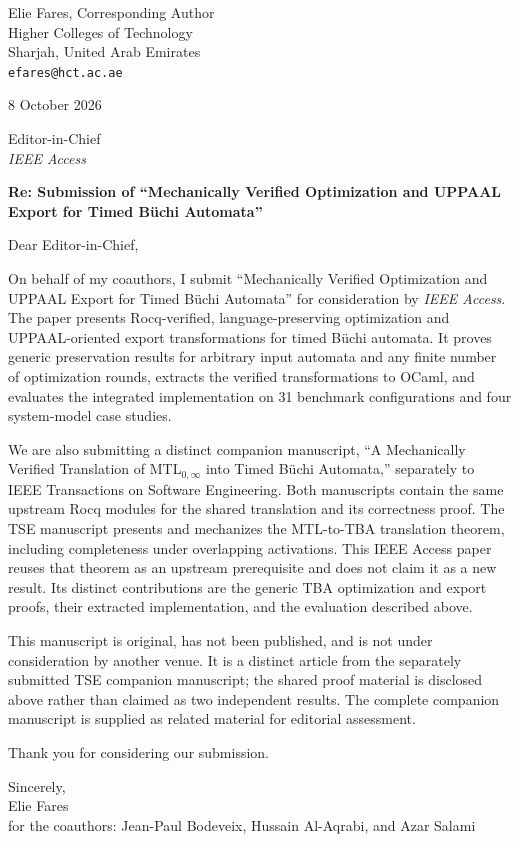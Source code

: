 \documentclass[11pt]{article}
\begin{document}
\begin{flushright}
Elie Fares, Corresponding Author\\
Higher Colleges of Technology\\
Sharjah, United Arab Emirates\\
\texttt{efares@hct.ac.ae}
\end{flushright}

8 October 2026

Editor-in-Chief\\
\emph{IEEE Access}

\textbf{Re: Submission of ``Mechanically Verified Optimization and UPPAAL Export for Timed B\"uchi Automata''}

Dear Editor-in-Chief,

On behalf of my coauthors, I submit ``Mechanically Verified Optimization and UPPAAL Export for Timed B\"uchi Automata'' for consideration by \emph{IEEE Access}. The paper presents Rocq-verified, language-preserving optimization and UPPAAL-oriented export transformations for timed B\"uchi automata. It proves generic preservation results for arbitrary input automata and any finite number of optimization rounds, extracts the verified transformations to OCaml, and evaluates the integrated implementation on 31 benchmark configurations and four system-model case studies.

We are also submitting a distinct companion manuscript, ``A Mechanically Verified Translation of MTL$_{0,\infty}$ into Timed B\"uchi Automata,'' separately to IEEE Transactions on Software Engineering. Both manuscripts contain the same upstream Rocq modules for the shared translation and its correctness proof. The TSE manuscript presents and mechanizes the MTL-to-TBA translation theorem, including completeness under overlapping activations. This IEEE Access paper reuses that theorem as an upstream prerequisite and does not claim it as a new result. Its distinct contributions are the generic TBA optimization and export proofs, their extracted implementation, and the evaluation described above.

This manuscript is original, has not been published, and is not under consideration by another venue. It is a distinct article from the separately submitted TSE companion manuscript; the shared proof material is disclosed above rather than claimed as two independent results. The complete companion manuscript is supplied as related material for editorial assessment.

Thank you for considering our submission.

Sincerely,\\[0.3em]
Elie Fares\\
for the coauthors: Jean-Paul Bodeveix, Hussain Al-Aqrabi, and Azar Salami
\end{document}

